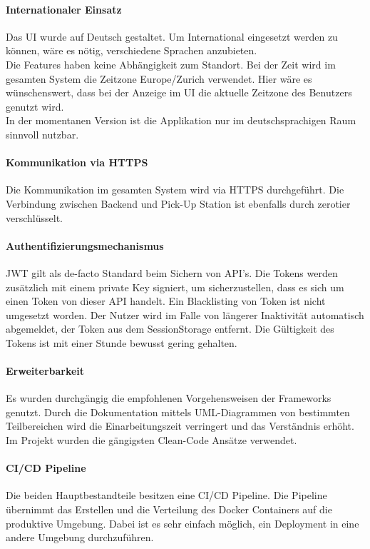 \paragraph{Internationaler Einsatz}
Das UI wurde auf Deutsch gestaltet. Um International eingesetzt werden zu können, wäre es nötig, verschiedene Sprachen anzubieten.\\ Die Features haben keine Abhängigkeit zum Standort. Bei der Zeit wird im gesamten System die Zeitzone Europe/Zurich verwendet. Hier wäre es wünschenswert, dass bei der Anzeige im \ac{UI} die aktuelle Zeitzone des Benutzers genutzt wird. \\
In der momentanen Version ist die Applikation nur im deutschsprachigen Raum sinnvoll nutzbar. 

\paragraph{Kommunikation via HTTPS}
Die Kommunikation im gesamten System wird via \ac{HTTPS} durchgeführt. Die Verbindung zwischen Backend und Pick-Up Station ist ebenfalls durch \gls{zerotier} verschlüsselt. 

\paragraph{Authentifizierungsmechanismus}
\ac{JWT} gilt als de-facto Standard beim Sichern von API's. Die Tokens werden zusätzlich mit einem private Key signiert, um sicherzustellen, dass es sich um einen Token von dieser API handelt. Ein Blacklisting von Token ist nicht umgesetzt worden. Der Nutzer wird im Falle von längerer Inaktivität automatisch abgemeldet, der Token aus dem \gls{SessionStorage} entfernt. Die Gültigkeit des Tokens ist mit einer Stunde bewusst gering gehalten. \\

\paragraph{Erweiterbarkeit}
Es wurden durchgängig die empfohlenen Vorgehensweisen der Frameworks genutzt. Durch die Dokumentation mittels \ac{UML}-Diagrammen von bestimmten Teilbereichen wird die Einarbeitungszeit verringert und das Verständnis erhöht. Im Projekt wurden die gängigsten Clean-Code Ansätze verwendet. 

\paragraph{CI/CD Pipeline}
Die beiden Hauptbestandteile besitzen eine CI/CD Pipeline. Die Pipeline übernimmt das Erstellen und die Verteilung des Docker Containers auf die produktive Umgebung. Dabei ist es sehr einfach möglich, ein Deployment in eine andere Umgebung durchzuführen. \\

